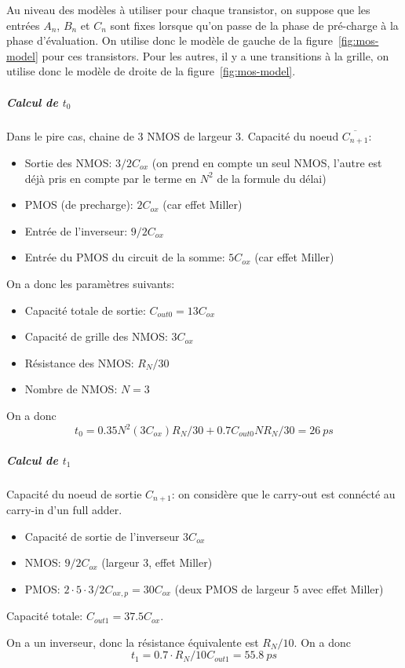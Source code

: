 \documentclass[frenchb,DIV=14]{scrartcl}
\begin{document}
Au niveau des modèles à utiliser pour chaque transistor, on suppose que les
entrées $A_n$, $B_n$ et $C_n$ sont fixes lorsque qu'on passe de la phase de
pré-charge à la phase d'évaluation. On utilise donc le modèle de gauche de la
figure~\ref{fig:mos-model} pour ces transistors. Pour les autres, il y a une
transitions à la grille, on utilise donc le modèle de droite de la figure~\ref{fig:mos-model}. 

\subparagraph{Calcul de $t_0$}
Dans le pire cas, chaine de 3 NMOS de largeur 3.
Capacité du noeud $\overline{C_{n+1}}$:
\begin{itemize}
    \item Sortie des NMOS: $3/2 C_{ox}$ (on prend en compte un seul NMOS, l'autre est
    déjà pris en compte par le terme en $N^2$ de la formule du délai)
    \item PMOS (de precharge): $2C_{ox}$ (car effet Miller)
    \item Entrée de l'inverseur: $9/2 C_{ox}$
    \item Entrée du PMOS du circuit de la somme: $5 C_{ox}$ (car effet Miller)
\end{itemize}

On a donc les paramètres suivants:
\begin{itemize}
    \item Capacité totale de sortie: $C_{out0} = 13 C_{ox}$
    \item Capacité de grille des NMOS: $3C_{ox}$
    \item Résistance des NMOS: $R_N/30$
    \item Nombre de NMOS: $N = 3$
\end{itemize}

On a donc
\[t_0 = 0.35 N^2 (3C_{ox}) R_N/30 + 0.7 C_{out0} N R_N/30 = \SI{26}{ps}\]

\subparagraph{Calcul de $t_1$}
Capacité du noeud de sortie $C_{n+1}$: on considère que le carry-out est
connécté au carry-in d'un full adder.
\begin{itemize}
\item Capacité de sortie de l'inverseur $3C_{ox}$
\item NMOS: $9/2 C_{ox}$ (largeur 3, effet Miller)
\item PMOS: $2\cdot 5 \cdot 3/2 C_{ox,p} = 30 C_{ox}$ (deux PMOS de largeur 5 avec effet Miller)
\end{itemize}
Capacité totale: $C_{out1} = 37.5C_{ox}$.

On a un inverseur, donc la résistance équivalente est $R_N/10$. On a donc
\[t_1 = 0.7 \cdot R_N/10 C_{out1} = \SI{55.8}{ps}\]
\end{document}
